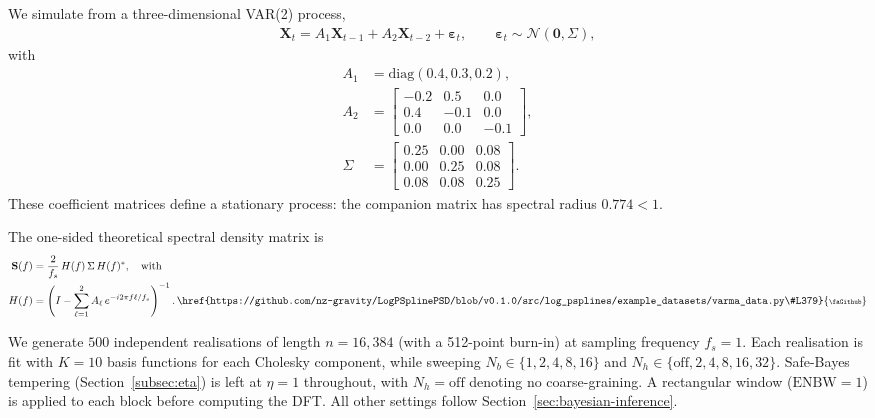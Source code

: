 \documentclass[%
	reprint,
	nofootinbib,
	amsmath,
	amssymb,
	aps,
]{revtex4-2}
\DeclareRobustCommand{\codelink}[1]{\,\href{#1}{\mbox{\scalebox{0.65}{\faGithub}}}}
\begin{document}
	We simulate from a three-dimensional VAR(2) process,
	\begin{align}
		\mathbf{X}_{t} = A_{1} \mathbf{X}_{t-1}+ A_{2} \mathbf{X}_{t-2}+ \boldsymbol{\varepsilon}_{t}, \qquad \boldsymbol{\varepsilon}_{t} \sim \mathcal{N}(\mathbf{0}, \Sigma),
	\end{align}
	with
	\begin{align}
		A_{1}  & = \mathrm{diag}(0.4, 0.3, 0.2),                                                   \\
		A_{2}  & = \begin{bmatrix}-0.2&0.5&0.0 \\ 0.4&-0.1&0.0 \\ 0.0&0.0&-0.1\end{bmatrix},       \\
		\Sigma & = \begin{bmatrix}0.25&0.00&0.08 \\ 0.00&0.25&0.08 \\ 0.08&0.08&0.25\end{bmatrix}.
	\end{align}
	These coefficient matrices define a stationary process: the companion
	matrix has spectral radius $0.774<1$.
    
	The one-sided theoretical spectral density matrix is
	\begin{align}
		\mathbf{S}(f) &= \frac{2}{f_{s}}\,H(f)\,\Sigma\,H(f)^{*}, \quad \text{with}\\
		H(f) &= \left(I-\sum_{\ell=1}^{2}A_{\ell}\, e^{-i2\pi f\ell/f_{s}}\right)^{-1}.
		\codelink{https://github.com/nz-gravity/LogPSplinePSD/blob/v0.1.0/src/log_psplines/example_datasets/varma_data.py\#L379}
	\end{align}

	We generate $500$ independent realisations of length $n=16{,}384$
	(with a 512-point burn-in) at sampling frequency $f_{s}=1$. Each
	realisation is fit with $K=10$ basis functions for each Cholesky
	component, while sweeping
	$N_{b}\in\{1,2,4,8,16\}$ and $N_{h}\in\{\text{off},2,4,8,16,32\}$.
	Safe-Bayes tempering (Section~\ref{subsec:eta}) is left at $\eta=1$
	throughout, with $N_{h}=\text{off}$ denoting no coarse-graining.
	A rectangular window ($\mathrm{ENBW}=1$) is applied to each block before
	computing the DFT.
	All other settings follow Section~\ref{sec:bayesian-inference}.
\end{document}
